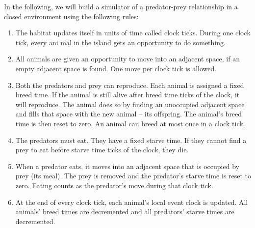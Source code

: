 In the following, we will build a simulator of a predator-prey relationship in a closed environment using the following rules:
\begin{enumerate}
\item The habitat updates itself in units of time called clock ticks. During one clock tick, every ani mal in the island gets an opportunity to do something.
\item All animals are given an opportunity to move into an adjacent space, if an empty adjacent space is found. One move per clock tick is allowed.
\item Both the predators and prey can reproduce. Each animal is assigned a fixed breed time. If the animal is still alive after breed time ticks of the clock, it will reproduce. The animal does so by finding an unoccupied adjacent space and fills that space with the new animal – its offspring. The animal’s breed time is then reset to zero. An animal can breed at most once in a clock tick.
\item The predators must eat. They have a fixed starve time. If they cannot find a prey to eat before starve time ticks of the clock, they die.
\item When a predator eats, it moves into an adjacent space that is occupied by prey (its meal). The prey is removed and the predator’s starve time is reset to zero. Eating counts as the predator’s move during that clock tick.
\item At the end of every clock tick, each animal’s local event clock is updated. All animals’ breed times are decremented and all predators’ starve times are decremented.
\end{enumerate}

